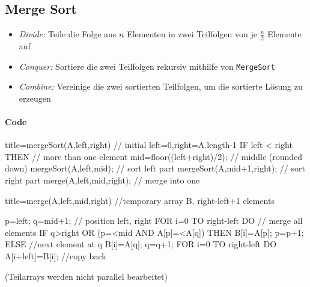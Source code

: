\documentclass[
    ngerman,
    color=3b,
    dark_mode,
    summary,
    boxarc,
]{rubos-tuda-template}
\begin{document}
\subsection{Merge Sort} \label{Merge Sort}
\begin{idea}\mbox{}
    \begin{itemize}
        \item \textit{Divide:} Teile die Folge aus $n$ Elementen in zwei Teilfolgen von je $\frac{n}{2}$ Elemente auf
        \item \textit{Conquer:} Sortiere die zwei Teilfolgen rekursiv mithilfe von \texttt{MergeSort}
        \item \textit{Combine:} Vereinige die zwei sortierten Teilfolgen, um die sortierte Lösung zu erzeugen
    \end{itemize}
\end{idea}
\paragraph{Code}\mbox{}
\begin{codeBlock}[autogobble,escapeinside=||]{title={mergeSort(A,left,right) // initial left=0,right=A.length-1}}
    IF left < right THEN // more than one element
        mid=floor((left+right)/2); // middle (rounded down)
        mergeSort(A,left,mid); // sort left part
        mergeSort(A,mid+1,right); // sort right part
        merge(A,left,mid,right); // merge into one
\end{codeBlock}

\begin{codeBlock}[autogobble,escapeinside=||]{title={merge(A,left,mid,right)}}
        //temporary array B, right-left+1 elements
    
    p=left; q=mid+1; // position left, right
    FOR i=0 TO right-left DO // merge all elements
        IF q>right OR (p=<mid AND A[p]=<A[q]) THEN
            B[i]=A[p];
            p=p+1;
        ELSE //next element at q
            B[i]=A[q];
            q=q+1;
    FOR i=0 TO right-left DO A[i+left]=B[i]; //copy back
\end{codeBlock}
(Teilarrays werden nicht parallel bearbeitet)
\end{document}
